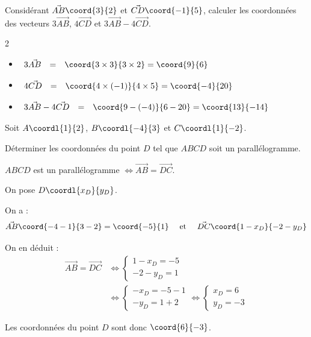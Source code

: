 \begin{methode}
	Considérant $\vec{AB}\coord{3}{2}$ et $\vec{CD}\coord{-1}{5}$, calculer les coordonnées des vecteurs $3\vec{AB}$, $4\vec{CD}$ et $3\vec{AB} - 4\vec{CD}$.

	\begin{correction}
		\nline
		\begin{multicols}{2}
			\begin{itemize}[label=]
				\item $\begin{array}{rcl} 3\vec{AB} & = & \coord{3\times3}{3\times2} = \coord{9}{6} \end{array}$
				\item $\begin{array}{rcl} 4\vec{CD} & = & \coord{4\times(-1)}{4\times5} = \coord{-4}{20} \end{array}$
				\item $\begin{array}{rcl} 3\vec{AB} - 4\vec{CD} & = & \coord{9-(-4)}{6-20} = \coord{13}{-14} \end{array}$
			\end{itemize}
		\end{multicols}
	\end{correction}
\end{methode}

\begin{methode}
	Soit $A\coordl{1}{2}$, $B\coordl{-4}{3}$ et $C\coordl{1}{-2}$.

	Déterminer les coordonnées du point $D$ tel que $ABCD$ soit un parallélogramme.

	\begin{correction}
		$ABCD$ est un parallélogramme $\iff \vec{AB} = \vec{DC}$.

		On pose $D\coordl{x_D}{y_D}$.

		On a :
		\[
			\vec{AB}\coord{-4-1}{3-2} = \coord{-5}{1}\quad\text{ et }\quad\vec{DC}\coord{1-x_D}{-2-y_D}
		\]

		On en déduit :
		\begin{align*}
			\vec{AB} = \vec{DC} & \iff \begin{cases} 1 - x_D = -5 \\ -2 - y_D = 1 \end{cases}                                                     \\
			                    & \iff \begin{cases} -x_D = -5 - 1 \\ -y_D = 1 + 2 \end{cases} \iff \begin{cases} x_D = 6 \\ y_D = -3 \end{cases}
		\end{align*}

		Les coordonnées du point $D$ sont donc $\coord{6}{-3}$.
	\end{correction}
\end{methode}

